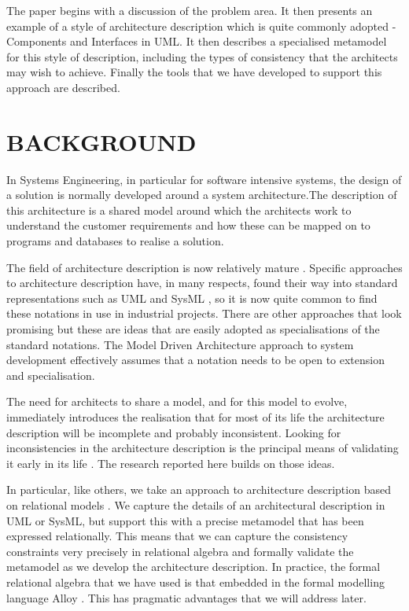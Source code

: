\documentclass[a4paper,twoside]{article}
\begin{document}
The paper begins with a discussion of the problem area. It then presents an example of a style of architecture description which is quite commonly adopted - Components and Interfaces in UML. It then describes a specialised metamodel for this style of description,  including the types of consistency that the architects may wish to achieve. Finally the tools that we have developed to support this approach are described.

\section{\uppercase{Background}}
\label{sec:background}

\noindent In Systems Engineering, in particular for software intensive systems, the design of a solution is normally developed around a system architecture.The description of this architecture is a shared model around which the architects work to understand the customer requirements and how these can be mapped on to programs and databases to realise a solution. 

The field of architecture description is now relatively mature \cite{Kruchten,Shaw1,Maier,Henderson2,Rozanski,Shaw}. Specific approaches to architecture description have, in many respects, found their way into standard representations such as UML \cite{UML} and SysML \cite{SysML}, so it is now quite common to find these notations in use in industrial projects. There are other approaches that look promising \cite{Holt,Hadar,Gokhale,Dekel} but these are ideas that are easily adopted as specialisations of the standard notations. The Model Driven Architecture approach to system development \cite{MDA} effectively assumes that a notation needs to be open to extension and specialisation.

The need for architects to share a model, and for this model to evolve, immediately introduces the realisation that for most of its life the architecture description will be incomplete and probably inconsistent. Looking for inconsistencies in the architecture description is the principal means of validating it early in its life \cite{Crocopat2,Chang,Koo,Hadar,Henderson3,Henderson4}. The research reported here builds on those ideas.

In particular, like others, we take an approach to architecture description based on relational models \cite{Holt,Crocopat2}. We capture the details of an architectural description in UML or SysML, but support this with a precise metamodel that has been expressed relationally. This means that we can capture the consistency constraints very precisely in relational algebra \cite{Date,Crocopat} and formally validate the metamodel as we develop the architecture description. In practice, the formal relational algebra that we have used is that embedded in the formal modelling language Alloy \cite{Alloy}. This has pragmatic advantages that we will address later. 
\end{document}
